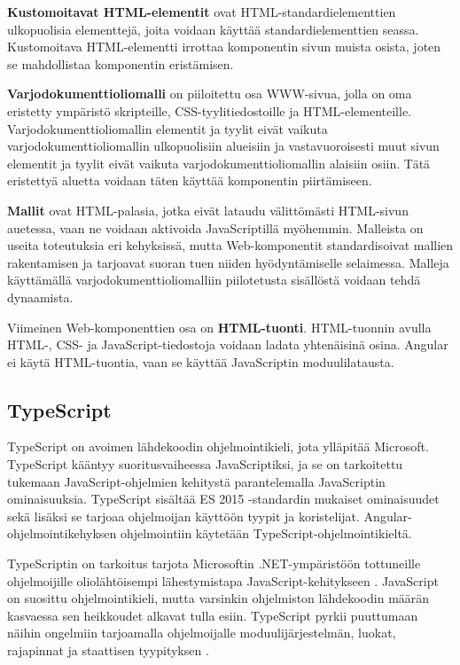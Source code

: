 \documentclass[utf8]{gradu3}
\begin{document}
\textbf{Kustomoitavat HTML-elementit} ovat HTML-standardielementtien ulkopuolisia elementtejä, joita voidaan käyttää standardielementtien seassa. Kustomoitava HTML-elementti irrottaa komponentin sivun muista osista, joten se mahdollistaa komponentin eristämisen. 

\textbf{Varjodokumenttioliomalli} on piiloitettu osa WWW-sivua, jolla on oma eristetty ympäristö skripteille, CSS-tyylitiedostoille ja HTML-elementeille. Varjodokumenttioliomallin elementit ja tyylit eivät vaikuta varjodokumenttioliomallin ulkopuolisiin alueisiin ja vastavuoroisesti muut sivun elementit ja tyylit eivät vaikuta varjodokumenttioliomallin alaisiin osiin. Tätä eristettyä aluetta voidaan täten käyttää komponentin piirtämiseen. 

\textbf{Mallit} ovat HTML-palasia, jotka eivät lataudu välittömästi HTML-sivun auetessa, vaan ne voidaan aktivoida JavaScriptillä myöhemmin. Malleista on useita toteutuksia eri kehyksissä, mutta Web-komponentit standardisoivat mallien rakentamisen ja tarjoavat suoran tuen niiden hyödyntämiselle selaimessa. Malleja käyttämällä varjodokumenttioliomalliin piilotetusta sisällöstä voidaan tehdä dynaamista. 

Viimeinen Web-komponenttien osa on \textbf{HTML-tuonti}. HTML-tuonnin avulla HTML-, CSS- ja JavaScript-tiedostoja voidaan ladata yhtenäisinä osina. Angular ei käytä HTML-tuontia, vaan se käyttää JavaScriptin moduulilatausta. \parencite[]{angular-6-by-example}

\subsection{TypeScript}

TypeScript on avoimen lähdekoodin ohjelmointikieli, jota ylläpitää Microsoft. TypeScript kääntyy suoritusvaiheessa JavaScriptiksi, ja se on tarkoitettu tukemaan JavaScript-ohjelmien kehitystä parantelemalla JavaScriptin ominaisuuksia. TypeScript sisältää ES 2015 -standardin mukaiset ominaisuudet sekä lisäksi se tarjoaa ohjelmoijan käyttöön tyypit ja koristelijat. Angular-ohjelmointikehyksen ohjelmointiin käytetään TypeScript-ohjelmointikieltä.

TypeScriptin on tarkoitus tarjota Microsoftin .NET-ympäristöön tottuneille ohjelmoijille oliolähtöisempi lähestymistapa JavaScript-kehitykseen \parencite[]{maharry-typescript}. JavaScript on suosittu ohjelmointikieli, mutta varsinkin ohjelmiston lähdekoodin määrän kasvaessa sen heikkoudet alkavat tulla esiin. TypeScript pyrkii puuttumaan näihin ongelmiin tarjoamalla ohjelmoijalle moduulijärjestelmän, luokat, rajapinnat ja staattisen tyypityksen \parencite[]{understanding-typescript}.
\end{document}
